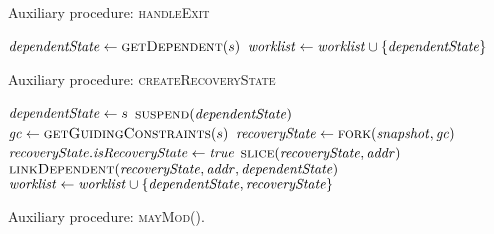 \begin{algorithm}
  \caption{Auxiliary procedure: \textsc{handleExit}
  \label{fig:aux-func-recS}}
\begin{algorithmic}[1]

 \label{alg:exit-check-recovery}
  \State {} \label{alg:exit-terminate-recovery}
  \State $\dependentState \gets  \Call{getDependent}{\workstate}$ \label{alg:exit-extract-dependent}
  \State {} \label{alg:exit-resume}
  \State $\mathit{worklist} \gets  \mathit{worklist} \cup \{\mathit{dependentState}\}$
\Else
  \State {}  \label{alg:exit-normal}
  \label{alg:push-worklist-exit}
\EndIf
\EndFunction
\end{algorithmic}
\end{algorithm}

\begin{algorithm}
  \caption{Auxiliary procedure: \textsc{createRecoveryState}
  \label{fig:aux-func-recS}}
\begin{algorithmic}[1]

   \label{alg:recover-foreach}
     \label{alg:recover-if-found}
       \State $\mathit{dependentState} \gets s$ \label{alg:recover-gen-depS}
       \State $\Call{suspend}{\dependentState}$ \label{alg:recover-suspend}
       \State $\gc \gets  \Call{getGuidingConstraints}{\workstate}$ \label{alg:recover-get-gc}
       \State $\recoveryState \gets \Call{fork}{\snapshot,\gc}$ \label{alg:recover-gen-recS}
       \State $\mathit{recoveryState}.\mathit{isRecoveryState} \gets \mathit{true}$ \label{alg:recover-set-is-recS}
       \State $\Call{slice}{\recoveryState,\addr}$ \label{alg:recover-slice}
       \State $\Call{linkDependent}{\recoveryState,\addr,\dependentState}$ \label{alg:recover-record-dep}
       \State $\mathit{worklist}  \gets  \mathit{worklist}  \cup \{\mathit{dependentState},\mathit{recoveryState}\}$
       \label{alg:push-worklist-recovery}
    \EndIf
  \EndFor
\EndFunction
\end{algorithmic}
\end{algorithm}

\begin{algorithm}
  \caption{Auxiliary procedure: \textsc{mayMod}().
  \label{fig:aux-func-may-mod}}
\begin{algorithmic}[1]


     \label{alg:maymod-static}
      \If{$\addr\not\in\owset$}  \label{alg:maymod-dynamic}
         \State {}
       \EndIf
    \EndIf
  \EndFor
  \State {}
\EndFunction

\end{algorithmic}
\end{algorithm}



